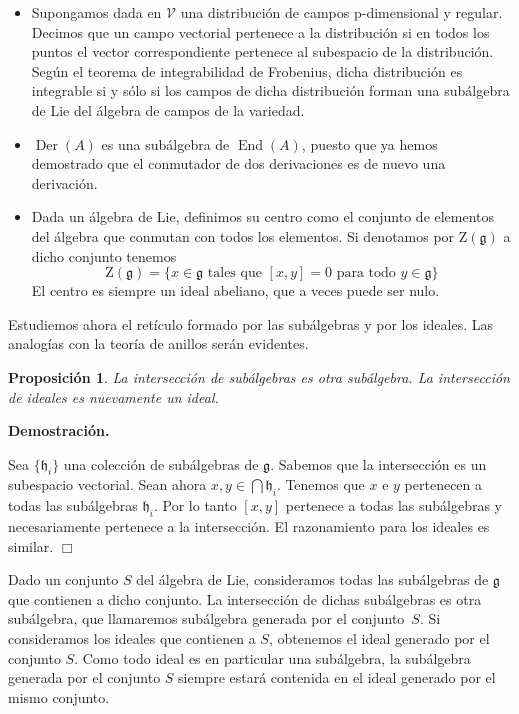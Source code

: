 \documentclass[a4paper,draft,12pt]{article}
\newtheorem{propo}[teo]{Proposición}%
\newcommand{\dem}{\noindent \textbf{Demostración. }\vspace{0.3 cm}}%
\newcommand{\g}{\mathfrak{g}}%
\newcommand{\fin}{ $\Box $ \vspace{0.4 cm}}
\newcommand{\df}[1]{\textsf{\color{blue}#1}}
\DeclareMathOperator{\End}{End}%
\DeclareMathOperator{\Der}{Der}%
\begin{document}
\begin{itemize}
\item Supongamos dada en $\mathcal{V}$ una distribución de campos  p-dimensional y regular. Decimos que un campo vectorial pertenece a la distribución si en todos los puntos el vector correspondiente pertenece al subespacio de la distribución. Según el teorema de integrabilidad de Frobenius,  dicha distribución es integrable si y sólo si los campos de dicha distribución forman una subálgebra de Lie del álgebra de campos de la variedad.

\item $\Der  (A)$ es una subálgebra de $\End (A)$, puesto que ya hemos demostrado que el conmutador de dos derivaciones es de nuevo una derivación.


\item Dada un álgebra de Lie, definimos su \df{centro} como el conjunto de elementos del álgebra que conmutan con todos los elementos.  Si denotamos por $\mathrm{Z}(\g)$ a dicho conjunto tenemos
\[
\mathrm{Z}(\g)=\{ x \in \g \text{ tales que } [x,y] = 0 \text{ para todo } y \in \g\}
\]
El centro es siempre un ideal abeliano, que a veces puede ser nulo. 

\end{itemize}


 
 Estudiemos ahora el retículo formado por las subálgebras y por los ideales. Las analogías con la teoría de anillos serán evidentes.
 
 \begin{propo}
 
 La intersección de subálgebras es otra subálgebra.  La intersección de ideales es nuevamente un ideal.
 
 \end{propo}

\dem

Sea $\{\mathfrak{h}_i\}$ una colección de subálgebras de $\g$.  Sabemos que la intersección es un subespacio vectorial.  Sean ahora $ x,y \in \bigcap\mathfrak{h}_i$. Tenemos que $x$ e $y$ pertenecen a todas las subálgebras $\mathfrak{h}_i$. Por lo tanto $[x,y]$ pertenece a todas las subálgebras y necesariamente pertenece a la intersección.  El razonamiento para los ideales es similar.  \fin

Dado un conjunto $S$ del álgebra de Lie, consideramos todas las subálgebras de $\g$ que contienen a dicho conjunto.  La intersección de dichas subálgebras es otra subálgebra, que llamaremos  \df{subálgebra generada}  por el conjunto~$S$.  Si consideramos los ideales que contienen a $S$, obtenemos el  \df{ideal generado} por el conjunto $S$. Como todo ideal es en particular una subálgebra, la subálgebra generada por el conjunto $S$ siempre estará contenida en el ideal generado  por el mismo conjunto.
\end{document}

